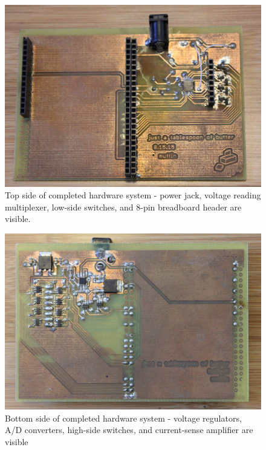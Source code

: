 \documentclass[11pt,twoside]{mitthesis}
\begin{document}
\begin{figure}[h]
  \begin{center}
      \includegraphics[width=.85\textwidth]{../butter-top.png}
      \caption{Top side of completed hardware system - power jack, voltage reading multiplexer, low-side switches, and 8-pin breadboard header are visible.}
  \end{center}
\end{figure}

\begin{figure}[h]
  \begin{center}
      \includegraphics[width=.85\textwidth]{../butter-bot.png}
      \caption{Bottom side of completed hardware system - voltage regulators, A/D converters, high-side switches, and current-sense amplifier are visible}
  \end{center}
\end{figure}
\end{document}
